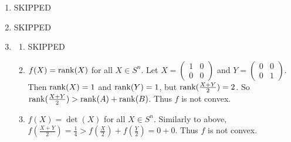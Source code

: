 \begin{enumerate}
\begin{enumerate}[label=(\arabic*)]
          \end{enumerate}
    \item {\color{red} SKIPPED}
    \item {\color{red} SKIPPED}
    \item \begin{enumerate}[label=(\arabic*)]
              \item {\color{red} SKIPPED}
              \item \(f(X) = \rank(X)\) for all \(X \in S^n\). Let \(X = \begin{pmatrix}
                        1 & 0 \\ 0 & 0
                    \end{pmatrix}\) and \(Y = \begin{pmatrix}
                        0 & 0 \\ 0 & 1
                    \end{pmatrix}\). Then \(\rank(X) = 1\) and \(\rank(Y) = 1\), but \(\rank(\frac{X + Y}{2}) = 2\). So \(\rank(\frac{X + Y}{2}) > \rank(A) + \rank(B)\). Thus \(f\) is not convex.
              \item \(f(X) = \det(X)\) for all \(X \in S^n\). Similarly to above, \(f(\frac{X + Y}{2}) = \frac{1}{4} > f(\frac{X}{2}) + f(\frac{Y}{2}) = 0 + 0\). Thus \(f\) is not convex.
          \end{enumerate}

\end{enumerate}

